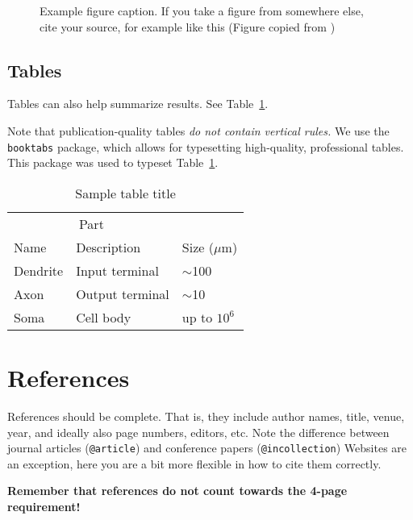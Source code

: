 \documentclass{article}
\begin{document}
\begin{figure}
  \centering
  \fbox{\rule[-.5cm]{0cm}{4cm} \rule[-.5cm]{4cm}{0cm}}
  \caption{Example figure caption. If you take a figure from somewhere else, cite your source, for example like this (Figure copied from \cite{NIPS2016_6300})}
  \label{fig:1}
\end{figure}

\subsection{Tables}

Tables can also help summarize results. See Table~\ref{sample-table}.

Note that publication-quality tables \emph{do not contain vertical rules.} We use the \verb+booktabs+ package, which allows for
typesetting high-quality, professional tables. This package was used to typeset Table~\ref{sample-table}.

\begin{table}
  \caption{Sample table title}
  \label{sample-table}
  \centering
  \begin{tabular}{lll}
    \toprule
    \multicolumn{2}{c}{Part}                   \\
    \cmidrule(r){1-2}
    Name     & Description     & Size ($\mu$m) \\
    \midrule
    Dendrite & Input terminal  & $\sim$100     \\
    Axon     & Output terminal & $\sim$10      \\
    Soma     & Cell body       & up to $10^6$  \\
    \bottomrule
  \end{tabular}
\end{table}


\newpage
\section*{References}

References should be complete. That is, they include author names, title, venue, year, and ideally also page numbers, editors, etc. Note the difference between journal articles (\verb+@article+) and conference papers (\verb+@incollection+) Websites are an exception, here you are a bit more flexible in how to cite them correctly. 

{\bf Remember that references do not count towards the 4-page requirement!}
\medskip
\small


\end{document}
